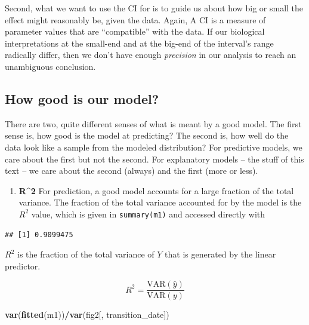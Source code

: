 \documentclass[]{book}
\newenvironment{Shaded}{\begin{snugshade}}{\end{snugshade}}
\newcommand{\KeywordTok}[1]{\textcolor[rgb]{0.13,0.29,0.53}{\textbf{#1}}}
\newcommand{\NormalTok}[1]{#1}
\newcommand{\OperatorTok}[1]{\textcolor[rgb]{0.81,0.36,0.00}{\textbf{#1}}}
\providecommand{\tightlist}{%
  \setlength{\itemsep}{0pt}\setlength{\parskip}{0pt}}
\begin{document}
Second, what we want to use the CI for is to guide us about how big or small the effect might reasonably be, given the data. Again, A CI is a measure of parameter values that are ``compatible'' with the data. If our biological interpretations at the small-end and at the big-end of the interval's range radically differ, then we don't have enough \emph{precision} in our analysis to reach an unambiguous conclusion.

\hypertarget{how-good-is-our-model}{%
\subsection{How good is our model?}\label{how-good-is-our-model}}

There are two, quite different senses of what is meant by a good model. The first sense is, how good is the model at predicting? The second is, how well do the data look like a sample from the modeled distribution? For predictive models, we care about the first but not the second. For explanatory models -- the stuff of this text -- we care about the second (always) and the first (more or less).

\begin{enumerate}
\def\labelenumi{\arabic{enumi}.}
\tightlist
\item
  \textbf{R\^{}2} For prediction, a good model accounts for a large fraction of the total variance. The fraction of the total variance accounted for by the model is the \(R^2\) value, which is given in \texttt{summary(m1)} and accessed directly with
\end{enumerate}

\begin{Shaded}
\end{Shaded}

\begin{verbatim}
## [1] 0.9099475
\end{verbatim}

\(R^2\) is the fraction of the total variance of \(Y\) that is generated by the linear predictor.

\begin{equation}
R^2 = \frac{\mathrm{VAR}(\hat{y})}{\mathrm{VAR}(y)}
\end{equation}

\begin{Shaded}
\begin{Highlighting}[]
\KeywordTok{var}\NormalTok{(}\KeywordTok{fitted}\NormalTok{(m1))}\OperatorTok{/}\KeywordTok{var}\NormalTok{(fig2[, transition_date])}
\end{Highlighting}
\end{Shaded}
\end{document}
